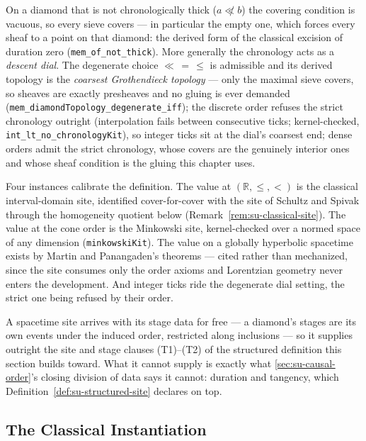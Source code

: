 On a diamond that is not chronologically thick ($a \not\ll b$) the covering
condition is vacuous, so every sieve covers --- in particular the empty one,
which forces every sheaf to a point on that diamond: the derived form of the
classical excision of duration zero (\texttt{mem\_of\_not\_thick}).
More generally the chronology acts as a \emph{descent dial}. The degenerate
choice $\ll\, =\, \le$ is admissible and its derived topology is the
\emph{coarsest Grothendieck topology} --- only the maximal sieve covers, so
sheaves are exactly presheaves and no gluing is ever demanded
(\texttt{mem\_diamondTopology\_degenerate\_iff}); the discrete order refuses
the strict chronology outright (interpolation fails between consecutive ticks;
kernel-checked, \texttt{int\_lt\_no\_chronologyKit}), so integer ticks sit at
the dial's coarsest end; dense orders admit the strict chronology, whose covers
are the genuinely interior ones and whose sheaf condition is the gluing this
chapter uses.

Four instances calibrate the definition. The value at
$(\mathbb{R}, \le, <)$ is the classical interval-domain site, identified
cover-for-cover with the site of Schultz and Spivak through the homogeneity
quotient below (Remark~\ref{rem:su-classical-site}). The value at the cone order
is the Minkowski site, kernel-checked over a normed space of any dimension
(\texttt{minkowskiKit}). The value on a globally hyperbolic spacetime exists
by Martin and Panangaden's theorems \cite{martin04} --- cited rather than
mechanized, since the site consumes only the order axioms and Lorentzian
geometry never enters the development. And integer ticks ride the degenerate
dial setting, the strict one being refused by their order.

A spacetime site arrives with its stage data for free --- a
diamond's stages are its own events under the induced order,
restricted along inclusions --- so it supplies outright the site and
stage clauses (T1)--(T2) of the structured definition this section
builds toward. What it cannot supply is exactly what
\autoref{sec:su-causal-order}'s closing division of data says it
cannot: duration and tangency, which
Definition~\ref{def:su-structured-site} declares on top.

\subsection{The Classical Instantiation}

